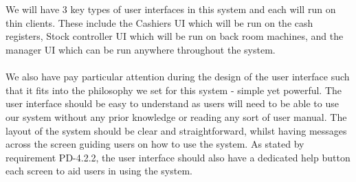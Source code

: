 \documentclass[a4paper]{article}
\begin{document}
\\\\
We will have 3 key types of user interfaces in this system and each will run on thin clients. These include the Cashiers UI which will be run on the cash registers, Stock controller UI which will be run on back room machines, and the manager UI which can be run anywhere throughout the system. 
\\\\
We also have pay particular attention during the design of the user interface such that it fits into the philosophy we set for this system - simple yet powerful. The user interface should be easy to understand as users will need to be able to use our system without any prior knowledge or reading any sort of user manual. The layout of the system should be clear and straightforward, whilst having messages across the screen guiding users on how to use the system. As stated by requirement PD-4.2.2, the user interface should also have a dedicated help button each screen to aid users in using the system.
\pagebreak
\end{document}
